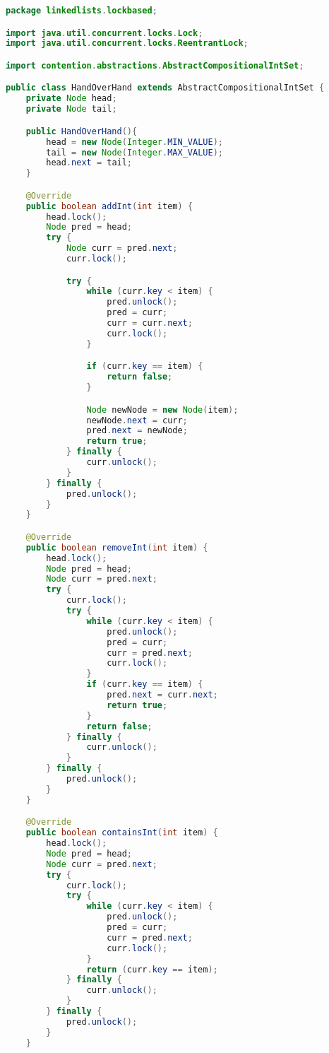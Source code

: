 \documentclass[12pt,a4paper]{article}
\begin{document}
\begin{lstlisting}[language=Java]
package linkedlists.lockbased;

import java.util.concurrent.locks.Lock;
import java.util.concurrent.locks.ReentrantLock;

import contention.abstractions.AbstractCompositionalIntSet;

public class HandOverHand extends AbstractCompositionalIntSet {
    private Node head;
    private Node tail;

    public HandOverHand(){
        head = new Node(Integer.MIN_VALUE);
        tail = new Node(Integer.MAX_VALUE);
        head.next = tail;
    }

    @Override
    public boolean addInt(int item) {
        head.lock();
        Node pred = head;
        try {
            Node curr = pred.next;
            curr.lock();

            try {
                while (curr.key < item) {
                    pred.unlock();
                    pred = curr;
                    curr = curr.next;
                    curr.lock();
                }

                if (curr.key == item) {
                    return false;
                }

                Node newNode = new Node(item);
                newNode.next = curr;
                pred.next = newNode;
                return true;
            } finally {
                curr.unlock();
            }
        } finally {
            pred.unlock();
        }
    }

    @Override
    public boolean removeInt(int item) {
        head.lock();
        Node pred = head;
        Node curr = pred.next;
        try {
            curr.lock();
            try {
                while (curr.key < item) {
                    pred.unlock();
                    pred = curr;
                    curr = pred.next;
                    curr.lock();
                }
                if (curr.key == item) {
                    pred.next = curr.next;
                    return true;
                }
                return false;
            } finally {
                curr.unlock();
            }
        } finally {
            pred.unlock();
        }
    }

    @Override
    public boolean containsInt(int item) {
        head.lock();
        Node pred = head;
        Node curr = pred.next;
        try {
            curr.lock();
            try {
                while (curr.key < item) {
                    pred.unlock();
                    pred = curr;
                    curr = pred.next;
                    curr.lock();
                }
                return (curr.key == item);
            } finally {
                curr.unlock();
            }
        } finally {
            pred.unlock();
        }
    }
    

\end{lstlisting}
\end{document}
